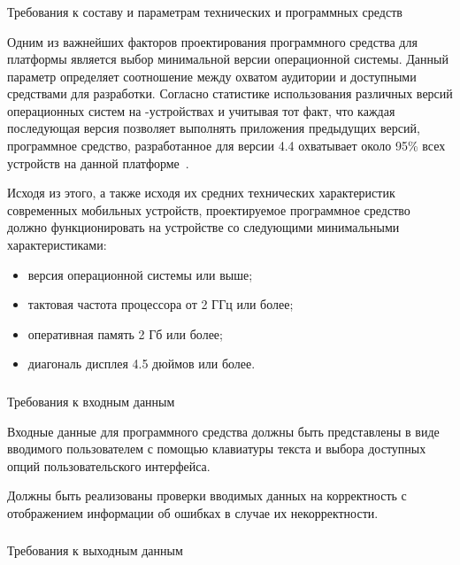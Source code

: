 \subsubsection{} Требования к составу и параметрам технических и программных средств
\label{sec:analysis:specification:minimal_requirements}

Одним из важнейших факторов проектирования программного средства для платформы \andro является выбор минимальной версии операционной системы.
Данный параметр определяет соотношение между охватом аудитории и доступными средствами для разработки.
Согласно статистике использования различных версий операционных систем на \andro-устройствах и учитывая тот факт, что каждая последующая версия позволяет выполнять приложения предыдущих версий, программное средство, разработанное для версии 4.4 охватывает около 95\% всех устройств на данной платформе~\cite{android_dashboard}.

Исходя из этого, а также исходя их средних технических характеристик современных мобильных устройств, проектируемое программное средство должно функционировать на устройстве со следующими минимальными характеристиками:
\begin{itemize}
    \item версия операционной системы  или выше;
    \item тактовая частота процессора от 2 ГГц или более;
    \item оперативная память 2 Гб или более;
    \item диагональ дисплея 4.5 дюймов или более.
\end{itemize}

\subsubsection{} Требования к входным данным
\label{sec:analysis:specification:inputs}

Входные данные для программного средства должны быть представлены в виде вводимого пользователем с помощью клавиатуры текста и выбора доступных опций пользовательского интерфейса.

Должны быть реализованы проверки вводимых данных на корректность с отображением информации об ошибках в случае их некорректности.

\subsubsection{} Требования к выходным данным
\label{sec:analysis:specification:outputs}

